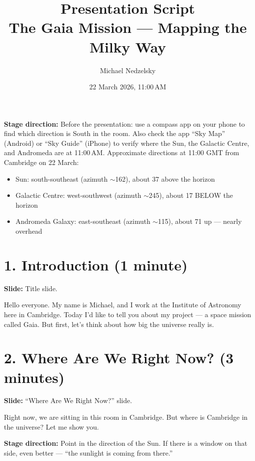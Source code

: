 \documentclass[10pt,a4paper]{article}
\title{Presentation Script\\[0.3em]\large The Gaia Mission --- Mapping the Milky Way}
\author{Michael Nedzelsky}
\date{22 March 2026, 11:00\,AM}
\newenvironment{stagenote}
  {\begin{mdframed}[linecolor=blue!50, backgroundcolor=blue!5, linewidth=1pt]%
   \small\color{blue!70!black}\textbf{Stage direction:} }
  {\end{mdframed}}
\newenvironment{slidenote}
  {\begin{mdframed}[linecolor=green!50!black, backgroundcolor=green!5, linewidth=1pt]%
   \small\color{green!40!black}\textbf{Slide:} }
  {\end{mdframed}}
\begin{document}
\maketitle

\begin{stagenote}
Before the presentation: use a compass app on your phone to find
which direction is South in the room. Also check the app ``Sky Map'' (Android)
or ``Sky Guide'' (iPhone) to verify where the Sun, the Galactic Centre,
and Andromeda are at 11:00\,AM. Approximate directions at 11:00 GMT
from Cambridge on 22 March:
\begin{itemize}[nosep]
    \item Sun: south-southeast (azimuth $\sim$162\textdegree), about 37\textdegree{} above the horizon
    \item Galactic Centre: west-southwest (azimuth $\sim$245\textdegree), about 17\textdegree{} BELOW the horizon
    \item Andromeda Galaxy: east-southeast (azimuth $\sim$115\textdegree), about 71\textdegree{} up --- nearly overhead
\end{itemize}
\end{stagenote}

\section*{1. Introduction (1 minute)}

\begin{slidenote}
Title slide.
\end{slidenote}

Hello everyone. My name is Michael, and I work at the Institute of Astronomy here in Cambridge. Today I'd like to tell you about my project --- a space mission called Gaia. But first, let's think about how big the universe really is.

\section*{2. Where Are We Right Now? (3 minutes)}

\begin{slidenote}
``Where Are We Right Now?'' slide.
\end{slidenote}

Right now, we are sitting in this room in Cambridge. But where is Cambridge in the universe? Let me show you.

\begin{stagenote}
Point in the direction of the Sun. If there is a window on that side,
even better --- ``the sunlight is coming from there.''
\end{stagenote}
\end{document}
